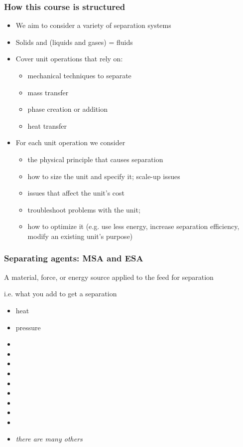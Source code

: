 \begin{frame}\frametitle{How this course is structured}
	\begin{itemize}
		\item	We aim to consider a variety of separation systems
		\item	Solids and (liquids and gases) = fluids
		\item	Cover unit operations that rely on:
		\begin{itemize}
			\item	mechanical techniques to separate
			\item	mass transfer
			\item	phase creation or addition
			\item	heat transfer
		\end{itemize}
		\item	For each unit operation we consider
		\begin{itemize}
			\item	the physical principle that causes separation
			\item	how to size the unit and specify it; scale-up issues
			\item	issues that affect the unit's cost
			\item	troubleshoot problems with the unit; 
			\item	how to optimize it (e.g. use less energy, increase separation efficiency, modify an existing unit's purpose)
			
		\end{itemize}
	\end{itemize}
\end{frame}

\begin{frame}\frametitle{Separating agents: MSA and ESA}	
	\begin{exampleblock}
		{A material, force, or energy source applied to the feed for separation }
	\end{exampleblock}
	\vspace{12pt}
	i.e. what you add to get a separation
	\vspace{12pt}
	\begin{itemize}
		\item	heat
		\item	pressure		
		\item	\pause\iftoggle{instructor}{vacuum}{}
		\item	\iftoggle{instructor}{membrane}{}
		\item	\iftoggle{instructor}{filter media}{}
		\item	\iftoggle{instructor}{electric field}{}
		\item	\iftoggle{instructor}{flow}{}
		\item	\iftoggle{instructor}{temperature gradient}{}
		\item	\iftoggle{instructor}{concentration gradient}{}
		\item	\iftoggle{instructor}{gravitational field}{}
		\item	\iftoggle{instructor}{adsorbent}{}
		\item	\emph{there are many others}
	\end{itemize}
\end{frame}

